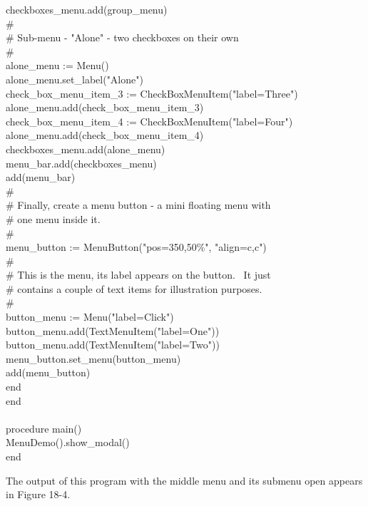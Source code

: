 {\>\>checkboxes\_menu.add(group\_menu) \\
\>\>\# \\
\>\>\# Sub-menu - "Alone" - two checkboxes on their own \\
\>\>\# \\
\>\>alone\_menu := Menu() \\
\>\>alone\_menu.set\_label("Alone") \\
\>\>check\_box\_menu\_item\_3 := CheckBoxMenuItem("label=Three") \\
\>\>alone\_menu.add(check\_box\_menu\_item\_3) \\
\>\>check\_box\_menu\_item\_4 := CheckBoxMenuItem("label=Four") \\
\>\>alone\_menu.add(check\_box\_menu\_item\_4) \\
\>\>checkboxes\_menu.add(alone\_menu) \\
\>\>menu\_bar.add(checkboxes\_menu) \\
\>\>add(menu\_bar) \\
\>\>\# \\
\>\>\# Finally, create a menu button - a mini floating menu with \\
\>\>\# one menu inside it. \\
\>\>\# \\
\>\>menu\_button := MenuButton("pos=350,50\%", "align=c,c") \\
\>\>\# \\
\>\>\# This is the menu, its label appears on the button. \ It just\\
\>\>\# contains a couple of text items for illustration purposes. \\
\>\>\# \\
\>\>button\_menu := Menu("label=Click") \\
\>\>button\_menu.add(TextMenuItem("label=One")) \\
\>\>button\_menu.add(TextMenuItem("label=Two")) \\
\>\>menu\_button.set\_menu(button\_menu) \\
\>\>add(menu\_button) \\
\>end \\
end \\
\ \\
procedure main() \\
\>MenuDemo().show\_modal() \\
end
}

The output of this program with the middle menu and its submenu open
appears in Figure 18-4.\\


